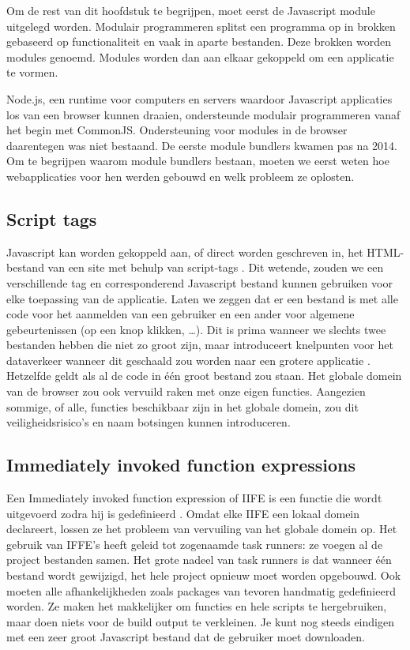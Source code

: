 Om de rest van dit hoofdstuk te begrijpen, moet eerst de \gls{Javascript} module uitgelegd worden. Modulair programmeren splitst een programma op in brokken gebaseerd op functionaliteit en vaak in aparte bestanden. Deze brokken worden modules genoemd. Modules worden dan aan elkaar gekoppeld om een applicatie te vormen. \autocite{webpack-no-dateB} \autocite{mozilla-2021A}

Node.js, een runtime voor computers en servers waardoor \gls{Javascript} applicaties los van een browser kunnen draaien, ondersteunde modulair programmeren vanaf het begin met CommonJS. Ondersteuning voor modules in de browser daarentegen was niet bestaand. De eerste module bundlers kwamen pas na 2014. Om te begrijpen waarom module bundlers bestaan, moeten we eerst weten hoe webapplicaties voor hen werden gebouwd en welk probleem ze oplosten. \autocite{webpack-no-dateA}

\subsection{Script tags}

\gls{Javascript} kan worden gekoppeld aan, of direct worden geschreven in, het \gls{HTML}-bestand van een site met behulp van script-tags \autocite{mozilla-2021}. Dit wetende, zouden we een verschillende tag en corresponderend \gls{Javascript} bestand kunnen gebruiken voor elke toepassing van de applicatie. Laten we zeggen dat er een bestand is met alle code voor het aanmelden van een gebruiker en een ander voor algemene gebeurtenissen (op een knop klikken, \ldots). Dit is prima wanneer we slechts twee bestanden hebben die niet zo groot zijn, maar introduceert knelpunten voor het dataverkeer wanneer dit geschaald zou worden naar een grotere applicatie \autocite{webpack-no-dateB}. Hetzelfde geldt als al de code in één groot bestand zou staan. Het globale domein van de browser zou ook vervuild raken met onze eigen functies. Aangezien sommige, of alle, functies beschikbaar zijn in het globale domein, zou dit veiligheidsrisico's en naam botsingen kunnen introduceren. 



\subsection{Immediately invoked function expressions}

Een Immediately invoked function expression of IIFE is een functie die wordt uitgevoerd zodra hij is gedefinieerd \autocite{mozilla-2021B}. Omdat elke IIFE een lokaal domein declareert, lossen ze het probleem van vervuiling van het globale domein op. Het gebruik van IFFE’s heeft geleid tot zogenaamde task runners: ze voegen al de project bestanden samen. Het grote nadeel van task runners is dat wanneer één bestand wordt gewijzigd, het hele project opnieuw moet worden opgebouwd. Ook moeten alle afhankelijkheden zoals \gls{packages} van tevoren handmatig gedefinieerd worden. Ze maken het makkelijker om functies en hele scripts te hergebruiken, maar doen niets voor de build output te verkleinen. Je kunt nog steeds eindigen met een zeer groot \gls{Javascript} bestand dat de gebruiker moet downloaden. 

